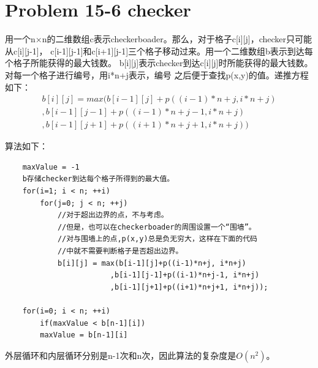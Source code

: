 \documentclass[a4paper, 11pt]{article}
\begin{document}
\section{Problem 15-6 checker}

用一个n×n的二维数组c表示checkerboader。那么，对于格子c[i][j]，checker只可能从c[i][j-1]，
c[i-1][j-1]和c[i+1][j-1]三个格子移动过来。用一个二维数组b表示到达每个格子所能获得的最大钱数。
b[i][j]表示checker到达c[i][j]时所能获得的最大钱数。对每一个格子进行编号，用i*n+j表示，编号
之后便于查找p(x,y)的值。递推方程如下：
\begin{align*}
                     b[i][j]=max(b[i-1][j]+p((i-1)*n+j, i*n+j)\\
                     		,b[i-1][j-1]+p((i-1)*n+j-1, i*n+j)\\
                     		,b[i-1][j+1]+p((i+1)*n+j+1, i*n+j))
\end{align*}

算法如下：
\begin{verbatim}
    maxValue = -1
    b存储checker到达每个格子所得到的最大值。
    for(i=1; i < n; ++i)
        for(j=0; j < n; ++j)
            //对于超出边界的点，不与考虑。
            //但是，也可以在checkerboader的周围设置一个“围墙”。
            //对与围墙上的点,p(x,y)总是负无穷大，这样在下面的代码
            //中就不需要判断格子是否超出边界。
            b[i][j] = max(b[i-1][j]+p((i-1)*n+j, i*n+j)
                        ,b[i-1][j-1]+p((i-1)*n+j-1, i*n+j)
                        ,b[i-1][j+1]+p((i+1)*n+j+1, i*n+j));

    for(i=0; i < n; ++i)
        if(maxValue < b[n-1][i])
        maxValue = b[n-1][i]
\end{verbatim}
	
外层循环和内层循环分别是n-1次和n次，因此算法的复杂度是$O(n^2)$。
\end{document}
